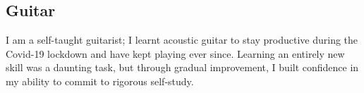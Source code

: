\documentclass{article}
\newcommand{\indentedblock}[1]{
    \hfill
    \begin{minipage}{\dimexpr\textwidth - 0.65cm}
        #1
    \end{minipage}
}
\begin{document}
\subsection*{\textbf{Guitar}}
\indentedblock{
    I am a self-taught guitarist; I learnt acoustic guitar to stay productive during the Covid-19 lockdown and have kept playing ever since. 
    Learning an entirely new skill was a daunting task, but through gradual improvement, I built confidence in my ability to commit 
    to rigorous self-study.
}
\end{document}
